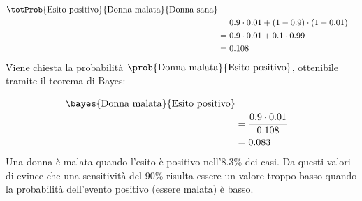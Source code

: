 \documentclass[\main/main.tex]{subfiles}
\begin{document}
\formulaProbTot

\begin{align*}
  \totProb{\text{Esito positivo}}{\text{Donna malata}}{\text{Donna sana}} \\
   & = 0.9\cdot0.01 + (1-0.9)\cdot(1-0.01)                                \\
   & = 0.9\cdot0.01 + 0.1\cdot0.99                                        \\
   & = 0.108
\end{align*}
Viene chiesta la probabilità $\prob{\text{Donna malata}}{\text{Esito positivo}}$, ottenibile tramite il teorema di Bayes:

\bayesTh

\begin{align*}
  \bayes{\text{Donna malata}}{\text{Esito positivo}} \\
   & = \frac{0.9\cdot0.01}{0.108}                    \\
   & = 0.083
\end{align*}
Una donna è malata quando l'esito è positivo nell'8.3\% dei casi. Da questi valori di evince che una sensitività del 90\% risulta essere un valore troppo basso quando la probabilità dell'evento positivo (essere malata) è basso.
\end{document}
